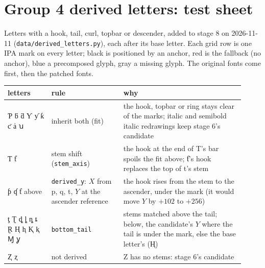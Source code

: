\documentclass[landscape]{article}
\begin{document}
\section*{Group 4 derived letters: test sheet}

Letters with a hook, tail, curl, topbar or descender, added to stage 8 on 2026-11-11 (\verb|data/derived_letters.py|), each after its base letter.
Each grid row is one IPA mark on every letter; black is positioned by an anchor, red is the fallback (no anchor), blue a precomposed glyph, gray a missing glyph.
The original fonts come first, then the patched fonts.

\begin{tabular}{>{\raggedright}p{0.17\linewidth}>{\raggedright}p{0.28\linewidth}p{0.47\linewidth}}
letters & rule & why \\
\hline
Ƥ ƃ ƌ Ƴ ƴ ƙ ƈ ẚ ꭒ & inherit both (fit) & the hook, topbar or ring stays clear of the marks; italic and semibold italic redrawings keep stage 6's candidate \\
Ƭ ƭ & stem shift (\verb|stem_axis|) & the hook at the end of T's bar spoils the fit above; ƭ's hook replaces the top of t's stem \\
ƥ ʠ ƭ above & \verb|derived_y|: $X$ from p, q, t, $Y$ at the ascender reference & the hook rises from the stem to the ascender, under the mark (it would move $Y$ by $+102$ to $+256$) \\
ƫ Ʈ ȡ ȴ ȵ ȶ Ɽ Ⱨ ⱨ Ⱪ ⱪ Ɱ ỿ & \verb|bottom_tail| & stems matched above the tail; below, the candidate's $Y$ where the tail is under the mark, else the base letter's (Ⱨ) \\
Ⱬ ⱬ & not derived & Z has no stems: stage 6's candidate \\
\end{tabular}




\end{document}
